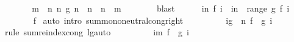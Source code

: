 \begin{isabellebody}
\ \ \ \ \isamarkupfalse%
\ \isamarkupfalse%
\ m\ \ n{\isacharcolon}{\kern0pt}\ {\isachardoublequoteopen}{\isasymAnd}n{\isacharprime}{\kern0pt}{\isachardot}{\kern0pt}\ g\ n{\isacharprime}{\kern0pt}\ {\isacharless}{\kern0pt}\ n\ {\isasymLongrightarrow}\ n{\isacharprime}{\kern0pt}\ {\isacharless}{\kern0pt}\ m{\isachardoublequoteclose}\isanewline
\ \ \ \ \ \ \isamarkupfalse%
\ blast\isanewline
\ \ \ \ \isamarkupfalse%
\ {\isachardoublequoteopen}{\isacharparenleft}{\kern0pt}{\isasymSum}i{\isacharless}{\kern0pt}n{\isachardot}{\kern0pt}\ f\ i{\isacharparenright}{\kern0pt}\ {\isacharequal}{\kern0pt}\ {\isacharparenleft}{\kern0pt}{\isasymSum}i{\isasymin}{\isacharbraceleft}{\kern0pt}{\isachardot}{\kern0pt}{\isachardot}{\kern0pt}{\isacharless}{\kern0pt}n{\isacharbraceright}{\kern0pt}\ {\isasyminter}\ range\ g{\isachardot}{\kern0pt}\ f\ i{\isacharparenright}{\kern0pt}{\isachardoublequoteclose}\isanewline
\ \ \ \ \ \ \isamarkupfalse%
\ f\ \isamarkupfalse%
{\isacharparenleft}{\kern0pt}auto\ intro{\isacharcolon}{\kern0pt}\ sum{\isachardot}{\kern0pt}mono{\isacharunderscore}{\kern0pt}neutral{\isacharunderscore}{\kern0pt}cong{\isacharunderscore}{\kern0pt}right{\isacharparenright}{\kern0pt}\isanewline
\ \ \ \ \isamarkupfalse%
\ \isamarkupfalse%
\ {\isachardoublequoteopen}{\isasymdots}\ {\isacharequal}{\kern0pt}\ {\isacharparenleft}{\kern0pt}{\isasymSum}i{\isasymin}g\ {\isacharminus}{\kern0pt}{\isacharbackquote}{\kern0pt}\ {\isacharbraceleft}{\kern0pt}{\isachardot}{\kern0pt}{\isachardot}{\kern0pt}{\isacharless}{\kern0pt}n{\isacharbraceright}{\kern0pt}{\isachardot}{\kern0pt}\ {\isacharparenleft}{\kern0pt}f\ {\isasymcirc}\ g{\isacharparenright}{\kern0pt}\ i{\isacharparenright}{\kern0pt}{\isachardoublequoteclose}\isanewline
\ \ \ \ \ \ \isamarkupfalse%
\ {\isacharparenleft}{\kern0pt}rule\ sum{\isachardot}{\kern0pt}reindex{\isacharunderscore}{\kern0pt}cong{\isacharbrackleft}{\kern0pt}\ l{\isacharequal}{\kern0pt}g{\isacharbrackright}{\kern0pt}{\isacharparenright}{\kern0pt}{\isacharparenleft}{\kern0pt}auto{\isacharparenright}{\kern0pt}\isanewline
\ \ \ \ \isamarkupfalse%
\ \isamarkupfalse%
\ {\isachardoublequoteopen}{\isasymdots}\ {\isasymle}\ {\isacharparenleft}{\kern0pt}{\isasymSum}i{\isacharless}{\kern0pt}m{\isachardot}{\kern0pt}\ {\isacharparenleft}{\kern0pt}f\ {\isasymcirc}\ g{\isacharparenright}{\kern0pt}\ i{\isacharparenright}{\kern0pt}{\isachardoublequoteclose}\isanewline

\end{isabellebody}
